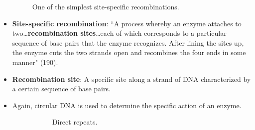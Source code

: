 \documentclass[titlepage]{article}
\numberwithin{figure}{section}
\numberwithin{table}{section}
\numberwithin{equation}{section}
\newcommand{\dq}[2]{``#1" (#2).}
\begin{document}
\begin{itemize}
\begin{figure}[h!]
        \caption{One of the simplest site-specific recombinations.}
        \label{fig:site-specirec}
    \end{figure}
    \item \textbf{Site-specific recombination}: \dq{A process whereby an enzyme attaches to two\dots\textbf{recombination sites}\dots each of which corresponds to a particular sequence of base pairs that the enzyme recognizes. After lining the sites up, the enzyme cuts the two strands open and recombines the four ends in some manner}{190}
    \item \textbf{Recombination site}: A specific site along a strand of DNA characterized by a certain sequence of base pairs.
    \item Again, circular DNA is used to determine the specific action of an enzyme.
    \begin{figure}[h!]
        \centering
        \begin{subfigure}[b]{0.2\linewidth}
            \centering
            \caption{Direct repeats.}
            \label{fig:directinverteda}
        \end{subfigure}
        \begin{subfigure}[b]{0.2\linewidth}
            \centering

\end{subfigure}
\end{figure}
\end{itemize}
\end{document}
